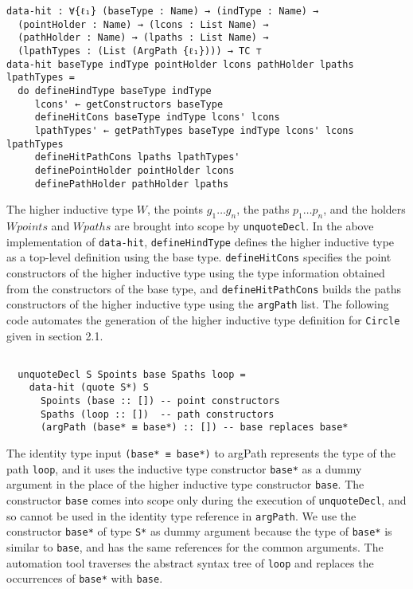 \documentclass[sigplan,10pt]{acmart}
\begin{document}
\begin{center}
\begingroup
\fontsize{7pt}{9pt}\selectfont
\begin{Verbatim}
data-hit : ∀{ℓ₁} (baseType : Name) → (indType : Name) →
  (pointHolder : Name) → (lcons : List Name) →
  (pathHolder : Name) → (lpaths : List Name) →
  (lpathTypes : (List (ArgPath {ℓ₁}))) → TC ⊤
data-hit baseType indType pointHolder lcons pathHolder lpaths lpathTypes =
  do defineHindType baseType indType
     lcons' ← getConstructors baseType
     defineHitCons baseType indType lcons' lcons
     lpathTypes' ← getPathTypes baseType indType lcons' lcons lpathTypes
     defineHitPathCons lpaths lpathTypes'
     definePointHolder pointHolder lcons
     definePathHolder pathHolder lpaths
\end{Verbatim}
\endgroup
\end{center}

The higher inductive type $W$, the points $g_1 \ldots g_n$, the paths $p_1 \ldots p_n$, and the holders $Wpoints$ and $Wpaths$ are brought into scope by {\tt unquoteDecl}. In the above implementation of {\tt data-hit}, {\tt defineHindType} defines the higher inductive type as a top-level definition using the base type. {\tt defineHitCons} specifies the point constructors of the higher inductive type using the type information obtained from the constructors of the base type, and {\tt defineHitPathCons} builds the paths constructors of the higher inductive type using the {\tt argPath} list. The following code automates the generation of the higher inductive type definition for {\tt Circle} given in section 2.1.
\begin{center}
\begingroup
\fontsize{8pt}{9pt}\selectfont
\begin{Verbatim}

  unquoteDecl S Spoints base Spaths loop =
    data-hit (quote S*) S
      Spoints (base :: []) -- point constructors
      Spaths (loop :: [])  -- path constructors
      (argPath (base* ≡ base*) :: []) -- base replaces base*

\end{Verbatim}
\endgroup
\end{center}

The identity type input {\tt (base* ≡ base*)} to argPath represents the type of the path {\tt loop}, and it uses the inductive type constructor {\tt base*} as a dummy argument in the place of the higher inductive type constructor {\tt base}. The constructor {\tt base} comes into scope only during the execution of {\tt unquoteDecl}, and so cannot be used in the identity type reference in {\tt argPath}. We use the constructor {\tt base*} of type {\tt S*} as dummy argument because the type of {\tt base*} is similar to {\tt base}, and has the same references for the common arguments. The automation tool traverses the abstract syntax tree of {\tt loop} and replaces the occurrences of {\tt base*} with {\tt base}.
\end{document}
